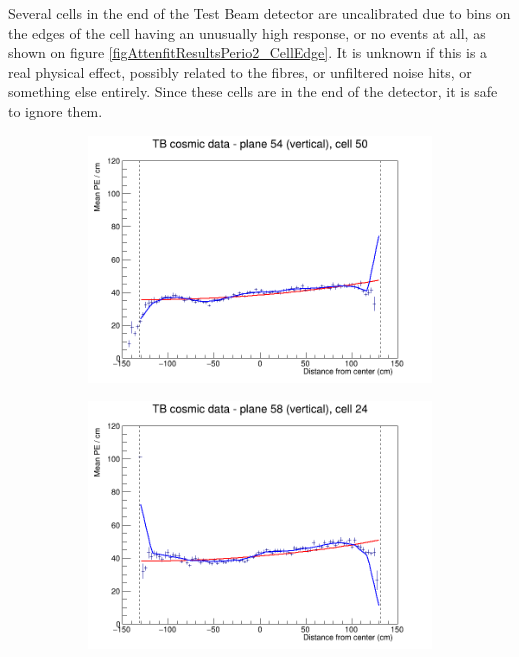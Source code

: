 \documentclass[12pt,a4paper]{article}
\begin{document}
Several cells in the end of the Test Beam detector are uncalibrated due to bins on the edges of the cell having an unusually high response, or no events at all, as shown on figure \ref{figAttenfitResultsPerio2_CellEdge}. It is unknown if this is a real physical effect, possibly related to the fibres, or unfiltered noise hits, or something else entirely. Since these cells are in the end of the detector, it is safe to ignore them.

\begin{figure}[h]
  \begin{subfigure}{0.5\textwidth}
    \includegraphics[width=\linewidth]{RelativeCalibrationResults/p2_054_050.png}
  \end{subfigure}
  \begin{subfigure}{0.5\textwidth}
    \includegraphics[width=\linewidth]{RelativeCalibrationResults/p2_058_024.png}

\end{subfigure}
\end{figure}
\end{document}
